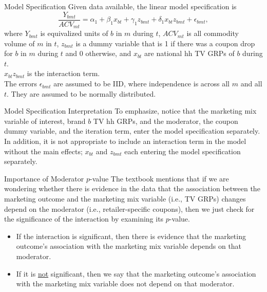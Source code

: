 \documentclass[pdf]{beamer}
\theoremstyle{remark}
\theoremstyle{definition}
\begin{document}
\begin{frame}[t]{Model Specification}
Given data available, the linear model specification is  \\
\vspace{-1.0ex}
\small
\begin{equation} \label{eq:a}
\frac{Y_{bmt}}{ACV_{mt}} = \alpha_1 + \beta_{1} x_{bt} + \gamma_1 z_{bmt} + \delta_1 x_{bt}z_{bmt} + \epsilon_{bmt},
 \end{equation}
 \normalsize
where $Y_{bmt}$ is equivalized units of $b$ in $m$ during $t$, $ACV_{mt}$ is all commodity volume of $m$ in $t$, $z_{bmt}$ is a dummy variable that is 1 if there was a coupon drop for $b$ in $m$ during $t$ and 0 otherwise, and $x_{bt}$ are national hh TV GRPs of $b$ during $t$. \\
\vspace{1.5ex}
 $ x_{bt}z_{bmt}$ is the interaction term.\\
\vspace{1.5ex}
 The errors $\epsilon_{bmt}$ are assumed to be IID, where independence is across all $m$ and all $t$.  They are assumed to be normally distributed. 
 \end{frame}

\begin{frame}[t]{Model Specification Interpretation}
To emphasize, notice that the marketing mix variable of interest, brand $b$ TV hh GRPs, and the moderator,  the coupon dummy variable, and the iteration term, enter the model specification separately. \\
\vspace{1.5ex}
In addition, it is not appropriate to include an interaction term in the model without the main effects; $x_{bt}$ and $z_{bmt}$ each entering the model specification separately.  \\
\end{frame}

\begin{frame}[t]{Importance of Moderator $p$-value}
The textbook mentions that if we are wondering whether there is evidence in the data that the association between the marketing outcome and the marketing mix variable (i.e., TV GRPs) changes depend on the moderator (i.e., retailer-specific coupons), then we just check for the significance of the interaction by examining its $p$-value.
\begin{itemize}
\item If the interaction is significant, then there is evidence that the marketing outcome's association with the marketing mix variable depends on that moderator. 
\item If it is \underline{not} significant, then we say that the marketing outcome's association
with the marketing mix variable does not depend on that moderator.
\end{itemize}
\end{frame}
\end{document}
